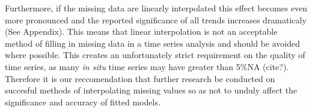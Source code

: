 Furthermore, if the missing data are linearly interpolated this effect becomes even more pronounced and the reported significance of all trends increases dramaticaly (See Appendix). This means that linear interpolation is not an acceptable method of filling in missing data in a time series analysis and should be avoided where possible. This creates an unfortunately strict requirement on the quality of time series, as many \emph{in situ} time series may have greater than 5\%NA (cite?). Therefore it is our reccomendation that further research be conducted on succesful methods of interpolating missing values so as not to unduly affect the significance and accuracy of fitted models.
